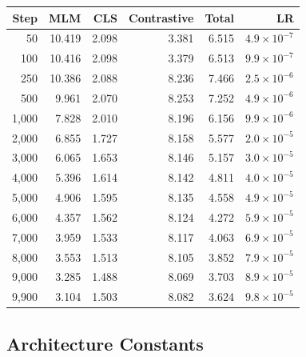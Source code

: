\documentclass[11pt,a4paper]{article}
\begin{document}
\begin{longtable}{@{}rrrrrr@{}}
\toprule
\textbf{Step} & \textbf{MLM} & \textbf{CLS} & \textbf{Contrastive} & \textbf{Total} & \textbf{LR} \\
\midrule
\endhead
50 & 10.419 & 2.098 & 3.381 & 6.515 & $4.9 \times 10^{-7}$ \\
100 & 10.416 & 2.098 & 3.379 & 6.513 & $9.9 \times 10^{-7}$ \\
250 & 10.386 & 2.088 & 8.236 & 7.466 & $2.5 \times 10^{-6}$ \\
500 & 9.961 & 2.070 & 8.253 & 7.252 & $4.9 \times 10^{-6}$ \\
1{,}000 & 7.828 & 2.010 & 8.196 & 6.156 & $9.9 \times 10^{-6}$ \\
2{,}000 & 6.855 & 1.727 & 8.158 & 5.577 & $2.0 \times 10^{-5}$ \\
3{,}000 & 6.065 & 1.653 & 8.146 & 5.157 & $3.0 \times 10^{-5}$ \\
4{,}000 & 5.396 & 1.614 & 8.142 & 4.811 & $4.0 \times 10^{-5}$ \\
5{,}000 & 4.906 & 1.595 & 8.135 & 4.558 & $4.9 \times 10^{-5}$ \\
6{,}000 & 4.357 & 1.562 & 8.124 & 4.272 & $5.9 \times 10^{-5}$ \\
7{,}000 & 3.959 & 1.533 & 8.117 & 4.063 & $6.9 \times 10^{-5}$ \\
8{,}000 & 3.553 & 1.513 & 8.105 & 3.852 & $7.9 \times 10^{-5}$ \\
9{,}000 & 3.285 & 1.488 & 8.069 & 3.703 & $8.9 \times 10^{-5}$ \\
9{,}900 & 3.104 & 1.503 & 8.082 & 3.624 & $9.8 \times 10^{-5}$ \\
\bottomrule
\end{longtable}

\subsection{Architecture Constants}
\end{document}
